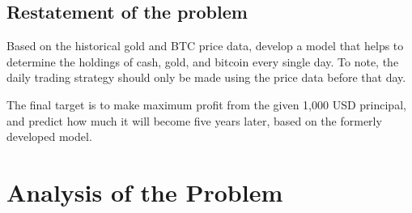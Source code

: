 \documentclass{mcmthesis}
\begin{document}
\subsection{Restatement of the problem}

Based on the historical gold and BTC price data,
develop a model that helps to determine the holdings of cash, gold, and bitcoin every single day.
To note, the daily trading strategy should only be made using the price data before that day.

The final target is to make maximum profit from the given 1,000 USD principal,
and predict how much it will become five years later, based on the formerly developed model.






\section{Analysis of the Problem}
\end{document}
